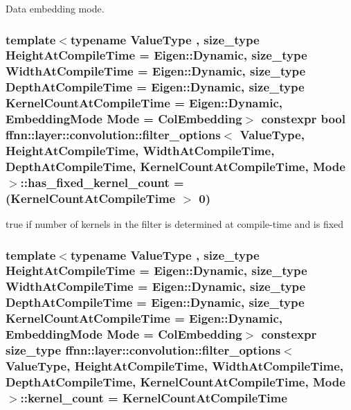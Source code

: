 Data embedding mode. 

\hypertarget{structffnn_1_1layer_1_1convolution_1_1filter__options_afbb18837e19377531a59cf8cf00e558f}{
\subsubsection[{has\-\_\-fixed\-\_\-kernel\-\_\-count}]{\setlength{\rightskip}{0pt plus 5cm}template$<$typename Value\-Type , size\-\_\-type Height\-At\-Compile\-Time = Eigen\-::\-Dynamic, size\-\_\-type Width\-At\-Compile\-Time = Eigen\-::\-Dynamic, size\-\_\-type Depth\-At\-Compile\-Time = Eigen\-::\-Dynamic, size\-\_\-type Kernel\-Count\-At\-Compile\-Time = Eigen\-::\-Dynamic, Embedding\-Mode Mode = Col\-Embedding$>$ constexpr bool {\bf ffnn\-::layer\-::convolution\-::filter\-\_\-options}$<$ Value\-Type, Height\-At\-Compile\-Time, Width\-At\-Compile\-Time, Depth\-At\-Compile\-Time, Kernel\-Count\-At\-Compile\-Time, Mode $>$\-::has\-\_\-fixed\-\_\-kernel\-\_\-count = (Kernel\-Count\-At\-Compile\-Time $>$ 0)\hspace{0.3cm}{\ttfamily [static]}}}\label{structffnn_1_1layer_1_1convolution_1_1filter__options_afbb18837e19377531a59cf8cf00e558f}


{\ttfamily true} if number of kernels in the filter is determined at compile-\/time and is fixed 

\hypertarget{structffnn_1_1layer_1_1convolution_1_1filter__options_a2afd4fea93bd997949e6352c8ace4586}{
\subsubsection[{kernel\-\_\-count}]{\setlength{\rightskip}{0pt plus 5cm}template$<$typename Value\-Type , size\-\_\-type Height\-At\-Compile\-Time = Eigen\-::\-Dynamic, size\-\_\-type Width\-At\-Compile\-Time = Eigen\-::\-Dynamic, size\-\_\-type Depth\-At\-Compile\-Time = Eigen\-::\-Dynamic, size\-\_\-type Kernel\-Count\-At\-Compile\-Time = Eigen\-::\-Dynamic, Embedding\-Mode Mode = Col\-Embedding$>$ constexpr {\bf size\-\_\-type} {\bf ffnn\-::layer\-::convolution\-::filter\-\_\-options}$<$ Value\-Type, Height\-At\-Compile\-Time, Width\-At\-Compile\-Time, Depth\-At\-Compile\-Time, Kernel\-Count\-At\-Compile\-Time, Mode $>$\-::kernel\-\_\-count = Kernel\-Count\-At\-Compile\-Time\hspace{0.3cm}{\ttfamily [static]}}}\label{structffnn_1_1layer_1_1convolution_1_1filter__options_a2afd4fea93bd997949e6352c8ace4586}



